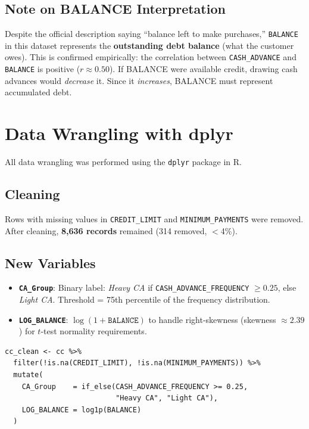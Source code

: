 \documentclass[12pt, letterpaper]{article}
\begin{document}
\subsection{Note on BALANCE Interpretation}

Despite the official description saying ``balance left to make purchases,''
\texttt{BALANCE} in this dataset represents the \textbf{outstanding debt balance}
(what the customer owes). This is confirmed empirically: the correlation between
\texttt{CASH\_ADVANCE} and \texttt{BALANCE} is positive ($r \approx 0.50$).
If BALANCE were available credit, drawing cash advances would \textit{decrease} it.
Since it \textit{increases}, BALANCE must represent accumulated debt.

\section{Data Wrangling with dplyr}

All data wrangling was performed using the \texttt{dplyr} package in R.

\subsection{Cleaning}

Rows with missing values in \texttt{CREDIT\_LIMIT} and \texttt{MINIMUM\_PAYMENTS}
were removed. After cleaning, \textbf{8{,}636 records} remained (314 removed, $<$4\%).

\subsection{New Variables}

\begin{itemize}
  \item \textbf{\texttt{CA\_Group}}: Binary label: \textit{Heavy CA} if
    \texttt{CASH\_ADVANCE\_FREQUENCY} $\geq 0.25$, else \textit{Light CA}.
    Threshold = 75th percentile of the frequency distribution.
  \item \textbf{\texttt{LOG\_BALANCE}}: $\log(1 + \texttt{BALANCE})$ to handle
    right-skewness (skewness $\approx 2.39$) for $t$-test normality requirements.
\end{itemize}

\begin{lstlisting}[caption={Data Wrangling Pipeline}]
cc_clean <- cc %>%
  filter(!is.na(CREDIT_LIMIT), !is.na(MINIMUM_PAYMENTS)) %>%
  mutate(
    CA_Group    = if_else(CASH_ADVANCE_FREQUENCY >= 0.25,
                          "Heavy CA", "Light CA"),
    LOG_BALANCE = log1p(BALANCE)
  )
\end{lstlisting}
\end{document}
